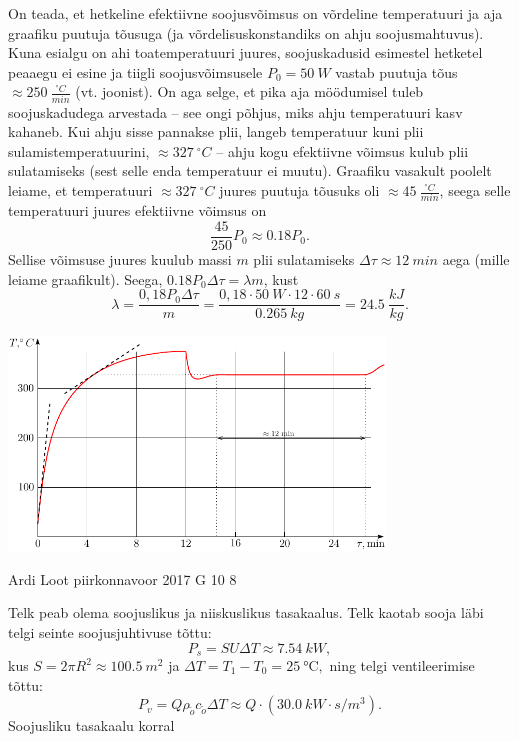 \documentclass[11pt, twoside]{article}
\begin{document}
{{\ifSolution
On teada, et hetkeline efektiivne soojusvõimsus on võrdeline temperatuuri ja aja graafiku puutuja tõusuga (ja võrdelisuskonstandiks on ahju soojusmahtuvus). Kuna esialgu on ahi toatemperatuuri juures, soojuskadusid esimestel hetketel peaaegu ei esine ja tiigli soojusvõimsusele $P_0 = \SI{50}{W}$ vastab puutuja tõus $\approx \SI{250}{\frac{^{\circ}C} {min}}$ (vt. joonist). On aga selge, et pika aja möödumisel tuleb soojuskadudega arvestada -- see ongi põhjus, miks ahju temperatuuri kasv kahaneb. Kui ahju sisse pannakse plii, langeb temperatuur kuni plii sulamistemperatuurini, $\approx \SI{327}{^\circ C}$ -- ahju kogu efektiivne võimsus kulub plii sulatamiseks (sest selle enda temperatuur ei muutu). Graafiku vasakult poolelt leiame, et temperatuuri $\approx \SI{327}{^\circ C}$ juures puutuja tõusuks oli $\approx \SI{45}{\frac{^{\circ}C} {min}}$, seega selle temperatuuri juures efektiivne võimsus on
\[
\frac{45}{250}P_0 \approx \num{0.18}P_0.
\]
Sellise võimsuse juures kuulub massi $m$ plii sulatamiseks $\Delta\tau \approx \SI{12}{min}$ aega (mille leiame graafikult). Seega, $\num{0.18} P_0 \Delta\tau = \lambda m$, kust
\[
\lambda = \frac{0,18 P_0 \Delta \tau}{ m} = \frac{0,18 \cdot \SI{50}{W} \cdot 12 \cdot \SI{60}{s}}{\SI{0.265}{kg}} = \SI{24.5}{\frac{kJ}{kg}}.
\]
\begin{center}
\includegraphics[width = 0.75\textwidth]{2012-v3g-07-ahi_lah}
\end{center}
\fi
}

{Ardi Loot} %
{piirkonnavoor} %
{2017} %
{G 10} %
{8} %
{

\ifSolution
Telk peab olema soojuslikus ja niiskuslikus tasakaalus. Telk kaotab
sooja läbi telgi seinte soojusjuhtivuse tõttu:
\[
P_{s}=SU\Delta T\approx\SI{7.54}{kW},
\]
kus $S=2\pi R^{2}\approx\SI{100.5}{m^{2}}$
ja $\Delta T=T_{1}-T_{0}=\SI{25}{\celsius},$ ning telgi ventileerimise tõttu:
\[
P_{v}=Q\rho_{\tilde{o}}c_{\tilde{o}}\Delta T\approx Q\cdot\left(\SI{30.0}{kW\cdot s/m^{3}}\right).
\]
Soojusliku tasakaalu korral

}}
\end{document}
